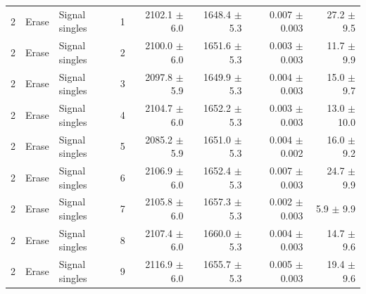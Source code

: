 \begin{tabular}{llllrrrr}
\midrule
2 & Erase & Signal singles & 1 & 2102.1 \ensuremath{\pm} 6.0 & 1648.4 \ensuremath{\pm} 5.3 & 0.007 \ensuremath{\pm} 0.003 & 27.2 \ensuremath{\pm} 9.5 \\
2 & Erase & Signal singles & 2 & 2100.0 \ensuremath{\pm} 6.0 & 1651.6 \ensuremath{\pm} 5.3 & 0.003 \ensuremath{\pm} 0.003 & 11.7 \ensuremath{\pm} 9.9 \\
2 & Erase & Signal singles & 3 & 2097.8 \ensuremath{\pm} 5.9 & 1649.9 \ensuremath{\pm} 5.3 & 0.004 \ensuremath{\pm} 0.003 & 15.0 \ensuremath{\pm} 9.7 \\
2 & Erase & Signal singles & 4 & 2104.7 \ensuremath{\pm} 6.0 & 1652.2 \ensuremath{\pm} 5.3 & 0.003 \ensuremath{\pm} 0.003 & 13.0 \ensuremath{\pm} 10.0 \\
2 & Erase & Signal singles & 5 & 2085.2 \ensuremath{\pm} 5.9 & 1651.0 \ensuremath{\pm} 5.3 & 0.004 \ensuremath{\pm} 0.002 & 16.0 \ensuremath{\pm} 9.2 \\
2 & Erase & Signal singles & 6 & 2106.9 \ensuremath{\pm} 6.0 & 1652.4 \ensuremath{\pm} 5.3 & 0.007 \ensuremath{\pm} 0.003 & 24.7 \ensuremath{\pm} 9.9 \\
2 & Erase & Signal singles & 7 & 2105.8 \ensuremath{\pm} 6.0 & 1657.3 \ensuremath{\pm} 5.3 & 0.002 \ensuremath{\pm} 0.003 & 5.9 \ensuremath{\pm} 9.9 \\
2 & Erase & Signal singles & 8 & 2107.4 \ensuremath{\pm} 6.0 & 1660.0 \ensuremath{\pm} 5.3 & 0.004 \ensuremath{\pm} 0.003 & 14.7 \ensuremath{\pm} 9.6 \\
2 & Erase & Signal singles & 9 & 2116.9 \ensuremath{\pm} 6.0 & 1655.7 \ensuremath{\pm} 5.3 & 0.005 \ensuremath{\pm} 0.003 & 19.4 \ensuremath{\pm} 9.6 \\
\bottomrule
\end{tabular}
